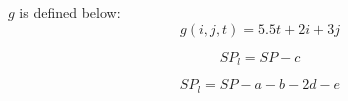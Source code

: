 \documentclass[12pt]{article}
\begin{document}
$g$ is defined below:
\begin{equation*}
g(i,j,t) =5.5t +2i+3j  	
\end{equation*}

\begin{equation*}
SP_l = SP - c	
\end{equation*}

\begin{equation*}
SP_l = SP - a -b - 2d -e	
\end{equation*}
\end{document}
